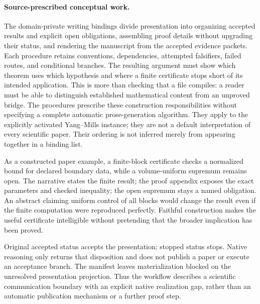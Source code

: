 \paragraph{Source-prescribed conceptual work.}
The domain-private writing bindings divide presentation into organizing accepted results and explicit open obligations, assembling proof details without upgrading their status, and rendering the manuscript from the accepted evidence packets. Each procedure retains conventions, dependencies, attempted falsifiers, failed routes, and conditional branches. The resulting argument must show which theorem uses which hypothesis and where a finite certificate stops short of its intended application. This is more than checking that a file compiles: a reader must be able to distinguish established mathematical content from an unproved bridge. The procedures prescribe these construction responsibilities without specifying a complete automatic prose-generation algorithm. They apply to the explicitly activated Yang--Mills instance; they are not a default interpretation of every scientific paper. Their ordering is not inferred merely from appearing together in a binding list.

As a constructed paper example, a finite-block certificate checks a normalized bound for declared boundary data, while a volume-uniform supremum remains open. The narrative states the finite result; the proof appendix exposes the exact parameters and checked inequality; the open supremum stays a named obligation. An abstract claiming uniform control of all blocks would change the result even if the finite computation were reproduced perfectly. Faithful construction makes the useful certificate intelligible without pretending that the broader implication has been proved.

Original accepted status accepts the presentation; stopped status stops. Native reasoning only returns that disposition and does not publish a paper or execute an acceptance branch. The manifest leaves materialization blocked on the unresolved presentation projection. Thus the workflow describes a scientific communication boundary with an explicit native realization gap, rather than an automatic publication mechanism or a further proof step.



